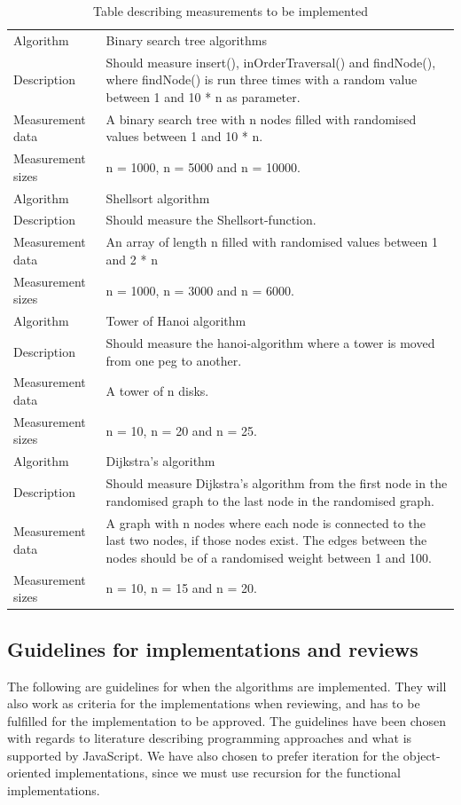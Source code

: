 \documentclass {article}
\begin{document}
\begin{table}[H]
\caption{Table describing measurements to be implemented}
\begin{tabular}{ | l p{10cm} | }
\hline
Algorithm & Binary search tree algorithms \\
Description & Should measure insert(), inOrderTraversal() and findNode(), where findNode() is run three times with a random value between 1 and 10 * n as parameter. \\
Measurement data & A binary search tree with n nodes filled with randomised values between 1 and 10 * n. \\ 
Measurement sizes & n = 1000, n = 5000 and n = 10000. \\
\hline
Algorithm & Shellsort algorithm \\
Description & Should measure the Shellsort-function.\\
Measurement data & An array of length n filled with randomised values between 1 and 2 * n \\ 
Measurement sizes & n = 1000, n = 3000 and n = 6000. \\
\hline
Algorithm & Tower of Hanoi algorithm \\
Description & Should measure the hanoi-algorithm where a tower is moved from one peg to another. \\
Measurement data & A tower of n disks. \\ 
Measurement sizes & n = 10, n = 20 and n = 25. \\
\hline
Algorithm & Dijkstra's algorithm \\
Description & Should measure Dijkstra's algorithm from the first node in the randomised graph to the last node in the randomised graph.\\
Measurement data & A graph with n nodes where each node is connected to the last two nodes, if those nodes exist. The edges between the nodes should be of a randomised weight between 1 and 100.\\ 
Measurement sizes & n = 10, n = 15 and n = 20. \\
\hline
\end{tabular}
\label{tab:measurements}
\end{table}
\subsection{Guidelines for implementations and reviews}
\label{sec:guidelines}
The following are guidelines for when the algorithms are implemented. They will also work as criteria for the implementations when reviewing, and has to be fulfilled for the implementation to be approved. The guidelines have been chosen with regards to literature describing programming approaches and what is supported by JavaScript. We have also chosen to prefer iteration for the object-oriented implementations, since we must use recursion for the functional implementations.
\label{sec:paradigm-guidelines}
 
\end{document}
